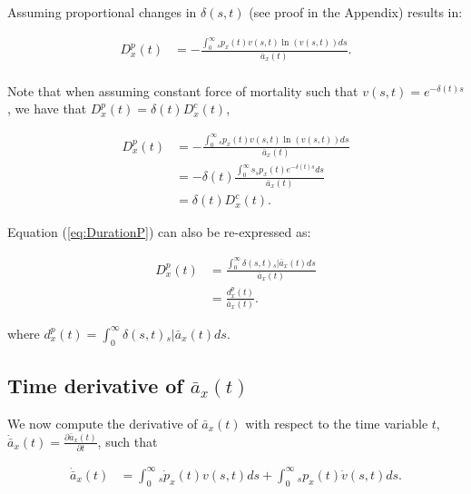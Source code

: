 \documentclass[12pt]{article}
\begin{document}
Assuming proportional changes in $\delta(s,t)$ (see proof in the Appendix) results in: 


\begin{equation}\label{eq:DurationP}
\begin{split}
{D}^{p}_{x}(t) &= -\frac{\int_0^\infty {}_sp_x(t) v(s,t) \ln(v(s,t))ds}{\bar{a}_x(t)}. \\
\end{split}
\end{equation}


Note that when assuming constant force of mortality such that $v(s,t)=e^{-\delta(t)s}$, we have that ${D}^{p}_{x}(t)=\delta(t){D}^{c}_{x}(t)$,


\begin{equation}\label{eq:DurationCP}
\begin{split}
{D}^{p}_{x}(t) &= -\frac{\int_0^\infty {}_sp_x(t) v(s,t) \ln(v(s,t))ds}  {\bar{a}_x(t)} \\
&=- \delta(t)\frac{\int_0^\infty s{}_sp_x(t) e^{-\delta(t)s}  ds}{\bar{a}_x(t)} \\
& = \delta(t){D}^{c}_{x}(t).
\end{split}
\end{equation}

Equation (\ref{eq:DurationP}) can also be re-expressed as:

\begin{equation}\label{eq:DurationP2}
\begin{split}
{D}^{p}_{x}(t) &= \frac{\int_0^\infty \delta(s,t) {}_s|\bar{a}_x(t)ds} {\bar{a}_x(t)} \\
                 &= \frac{{d}^{p}_{x}(t)}{\bar{a}_x(t)}.
\end{split}
\end{equation}


where ${d}^{p}_{x}(t)=\int_0^\infty \delta(s,t) {}_s|\bar{a}_x(t) ds$. 




\subsection{Time derivative of $\bar{a}_x(t)$} \label{sec:timderiv}

We now compute the derivative of $\bar{a}_x(t)$ with respect to the time variable $t$, $\dot{\bar{a}} _x(t)=\frac{\partial \bar{a}_x(t)}{\partial t}$, such that

\begin{equation}\label{eq:TimeDeriv}
\begin{split}
\dot{\bar{a}} _x(t) &= \int_0^\infty {}_s\dot{p}_x(t) v(s,t)ds +\int_0^\infty {}_sp_x(t) \dot{v}(s,t)ds.\\
\end{split}
\end{equation}
\end{document}
